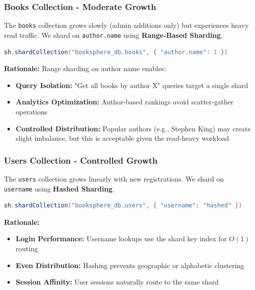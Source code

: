 \subsubsection{Books Collection - Moderate Growth}
The \texttt{books} collection grows slowly (admin additions only) but experiences heavy read traffic. We shard on \texttt{author.name} using \textbf{Range-Based Sharding}.

\begin{lstlisting}[language=Java, caption={Sharding Configuration for Books}]
sh.shardCollection("booksphere_db.books", { "author.name": 1 })
\end{lstlisting}

\textbf{Rationale:} Range sharding on author name enables:
\begin{itemize}
    \item \textbf{Query Isolation:} "Get all books by author X" queries target a single shard
    \item \textbf{Analytics Optimization:} Author-based rankings avoid scatter-gather operations
    \item \textbf{Controlled Distribution:} Popular authors (e.g., Stephen King) may create slight imbalance, but this is acceptable given the read-heavy workload
\end{itemize}

\subsubsection{Users Collection - Controlled Growth}
The \texttt{users} collection grows linearly with new registrations. We shard on \texttt{username} using \textbf{Hashed Sharding}.

\begin{lstlisting}[language=Java, caption={Sharding Configuration for Users}]
sh.shardCollection("booksphere_db.users", { "username": "hashed" })
\end{lstlisting}

\textbf{Rationale:}
\begin{itemize}
    \item \textbf{Login Performance:} Username lookups use the shard key index for $O(1)$ routing
    \item \textbf{Even Distribution:} Hashing prevents geographic or alphabetic clustering
    \item \textbf{Session Affinity:} User sessions naturally route to the same shard
\end{itemize}


